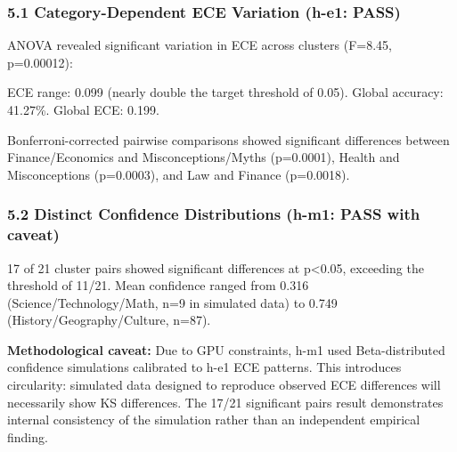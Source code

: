 
\subsubsection{5.1 Category-Dependent ECE Variation (h-e1: PASS)}

ANOVA revealed significant variation in ECE across clusters (F=8.45, p=0.00012):

\begin{table}[htbp]
\centering
{}
\end{table}

ECE range: 0.099 (nearly double the target threshold of 0.05). Global accuracy: 41.27\%. Global ECE: 0.199.

Bonferroni-corrected pairwise comparisons showed significant differences between Finance/Economics and Misconceptions/Myths (p=0.0001), Health and Misconceptions (p=0.0003), and Law and Finance (p=0.0018).

\subsubsection{5.2 Distinct Confidence Distributions (h-m1: PASS with caveat)}

17 of 21 cluster pairs showed significant differences at p<0.05, exceeding the threshold of 11/21. Mean confidence ranged from 0.316 (Science/Technology/Math, n=9 in simulated data) to 0.749 (History/Geography/Culture, n=87).

\textbf{Methodological caveat:} Due to GPU constraints, h-m1 used Beta-distributed confidence simulations calibrated to h-e1 ECE patterns. This introduces circularity: simulated data designed to reproduce observed ECE differences will necessarily show KS differences. The 17/21 significant pairs result demonstrates internal consistency of the simulation rather than an independent empirical finding.

